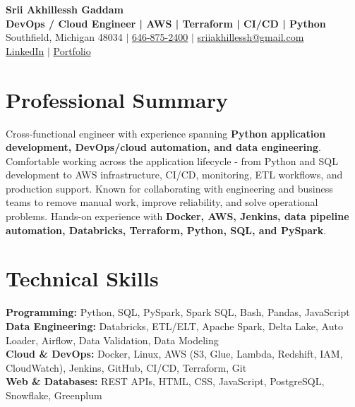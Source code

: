 \documentclass[letterpaper,10pt]{article}
\begin{document}
\fontsize{9.35pt}{10.45pt}\selectfont

\begin{center}
    {\LARGE \textbf{Srii Akhillessh Gaddam}} \\[-1pt]
    \textbf{DevOps / Cloud Engineer | AWS | Terraform | CI/CD | Python} \\[2pt]
    Southfield, Michigan 48034 $|$
    \href{tel:6468752400}{646-875-2400} $|$
    \href{mailto:sriiakhillessh@gmail.com}{sriiakhillessh@gmail.com} \\[1pt]
    \href{https://www.linkedin.com/in/srii-akhiilessh-gaddam-b48668191/}{LinkedIn} $|$
    \href{https://sriiakhillesshg.github.io/portfolio/}{Portfolio}
\end{center}
\vspace{-8pt}

\section{Professional Summary}
\small{Cross-functional engineer with experience spanning \textbf{Python application development, DevOps/cloud automation, and data engineering}. Comfortable working across the application lifecycle - from Python and SQL development to AWS infrastructure, CI/CD, monitoring, ETL workflows, and production support. Known for collaborating with engineering and business teams to remove manual work, improve reliability, and solve operational problems. Hands-on experience with \textbf{Docker, AWS, Jenkins, data pipeline automation, Databricks, Terraform, Python, SQL, and PySpark}.}

\section{Technical Skills}
\small{
\textbf{Programming:} Python, SQL, PySpark, Spark SQL, Bash, Pandas, JavaScript \\
\textbf{Data Engineering:} Databricks, ETL/ELT, Apache Spark, Delta Lake, Auto Loader, Airflow, Data Validation, Data Modeling \\
\textbf{Cloud \& DevOps:} Docker, Linux, AWS (S3, Glue, Lambda, Redshift, IAM, CloudWatch), Jenkins, GitHub, CI/CD, Terraform, Git \\
\textbf{Web \& Databases:} REST APIs, HTML, CSS, JavaScript, PostgreSQL, Snowflake, Greenplum
}
\end{document}
